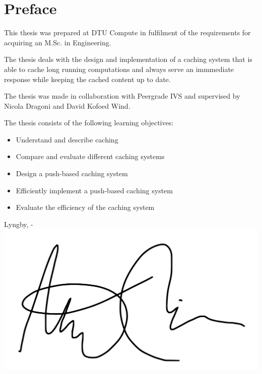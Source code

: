 \chapter{Preface}

This thesis was prepared at DTU Compute in fulfilment of the requirements for acquiring an M.Sc. in Engineering.

The thesis deals with the design and implementation of a caching system that is able to cache long running computations and always serve an immmediate response while keeping the cached content up to date.

The thesis was made in collaboration with Peergrade IVS and supervised by Nicola Dragoni and David Kofoed Wind.

The thesis consists of the following learning objectives:

\begin{itemize}
  \item Understand and describe caching
  \item Compare and evaluate different caching systems
  \item Design a push-based caching system
  \item Efficiently implement a push-based caching system
  \item Evaluate the efficiency of the caching system
\end{itemize}

\vspace{20mm}
\begin{center}
    \hspace{20mm} Lyngby, \thesishandin-\thesisyear
    \vspace{5mm}
    \newline
    \includegraphics[scale=0.25]{signature.png}
\end{center}
\begin{flushright}
    \thesisauthor
\end{flushright}
